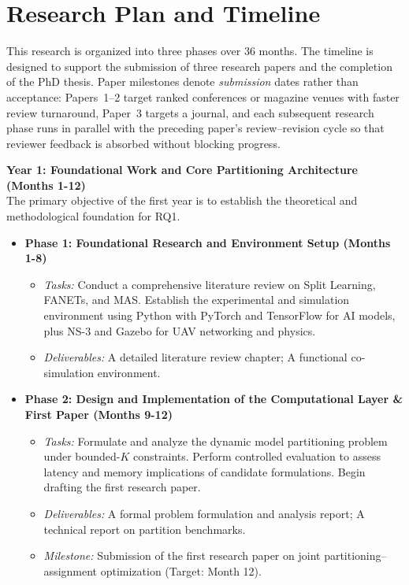 \section*{Research Plan and Timeline}
This research is organized into three phases over 36 months. The timeline is designed to support the submission of three research papers and the completion of the PhD thesis. Paper milestones denote \emph{submission} dates rather than acceptance: Papers~1--2 target ranked conferences or magazine venues with faster review turnaround, Paper~3 targets a journal, and each subsequent research phase runs in parallel with the preceding paper's review--revision cycle so that reviewer feedback is absorbed without blocking progress.

\textbf{Year 1: Foundational Work and Core Partitioning Architecture (Months 1-12)} \\
The primary objective of the first year is to establish the theoretical and methodological foundation for RQ1.
\begin{itemize}
  \item \textbf{Phase 1: Foundational Research and Environment Setup (Months 1-8)}
    \begin{itemize}
      \item \textit{Tasks:} Conduct a comprehensive literature review on Split Learning, FANETs, and MAS. Establish the experimental and simulation environment using Python with PyTorch and TensorFlow for AI models, plus NS-3 and Gazebo for UAV networking and physics.
      \item \textit{Deliverables:} A detailed literature review chapter; A functional co-simulation environment.
    \end{itemize}
  \item \textbf{Phase 2: Design and Implementation of the Computational Layer \& First Paper (Months 9-12)}
    \begin{itemize}
      \item \textit{Tasks:} Formulate and analyze the dynamic model partitioning problem under bounded-$K$ constraints. Perform controlled evaluation to assess latency and memory implications of candidate formulations. Begin drafting the first research paper.
      \item \textit{Deliverables:} A formal problem formulation and analysis report; A technical report on partition benchmarks.
      \item \textit{Milestone:} Submission of the first research paper on joint partitioning--assignment optimization (Target: Month 12).
    \end{itemize}
\end{itemize}

